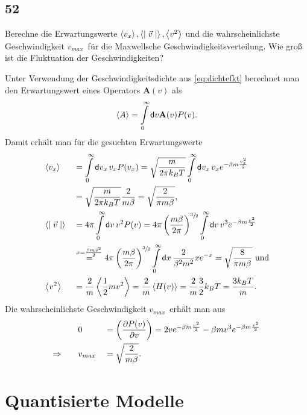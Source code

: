 \subsection{52}
\newcommand{\vmax}{\ensuremath{v_{max}}}
\begin{myfrag}
Berechne die Erwartungswerte $\left\langle v_x \right\rangle , \left\langle \mid \vec{v} \mid  \right\rangle , \left\langle v^2 \right\rangle $ und die wahrscheinlichste
Geschwindigkeit \vmax\, für die Maxwellsche Geschwindigkeitsverteilung. Wie
groß ist die Fluktuation der Geschwindigkeiten?
\end{myfrag}
Unter Verwendung der Geschwindigkeitsdichte aus \eqref{eq:dichtefkt} berechnet man den Erwartungswert eines Operators $\mathbf A(v)$ als
\begin{equation}
	\langle A\rangle=\int\limits_0^\infty\mathsf{d} v\mathbf A(v)P(v).
\end{equation}
Damit erhält man für die gesuchten Erwartungswerte
\begin{alignat}{2}
	&\left\langle v_x \right\rangle&&=\int\limits_0^\infty\mathsf{d} v_x\,v_xP(v_x)=\sqrt{\frac{m}{2\pi k_BT}}\int\limits_0^\infty\mathsf{d} v_x\,v_xe^{-\beta m\frac{v_x^2}{2}}\nonumber\\
	&&&=\sqrt{\frac{m}{2\pi k_BT}}\frac{2}{m\beta}=\sqrt{\frac{2}{\pi m\beta}},\\
	&\left\langle \mid \vec{v} \mid \right\rangle&&=4\pi\int\limits_0^\infty\mathsf{d} v\,v^2P(v)=4\pi\left(\frac{m\beta}{2\pi}\right)^{\sfrac{3}{2}}\int\limits_0^\infty\mathsf{d} v\,v^3e^{-\beta m\frac{v^2}{2}}\nonumber\\
	&&&\overset{x=\frac{\beta mv^2}{2}}{=}4\pi\left(\frac{m\beta}{2\pi}\right)^{\sfrac{3}{2}}\int\limits_0^\infty\mathsf{d} x\,\frac{2}{\beta^2 m^2} xe^{-x}=\sqrt{\frac{8}{\pi m\beta}}\text{ und}\\
	&\left\langle v^2 \right\rangle&&=\frac{2}{m}\left\langle\frac{1}{2}mv^2\right\rangle=\frac{2}{m}\left\langle H(v)\right\rangle=\frac{2}{m}\frac{3}{2}k_BT=\frac{3k_BT}{m}.
\end{alignat}
Die wahrscheinlichste Geschwindigkeit \vmax\, erhält man aus
\begin{alignat}{2}
	&0&&=\partdd{P(v)}v=2ve^{-\beta m\frac{v^2}{2}}-\beta mv^3e^{-\beta m\frac{v^2}{2}}\\
	\Rightarrow\qquad&\vmax&&=\sqrt{\frac{2}{m\beta}}.
\end{alignat}
\section{Quantisierte Modelle}
